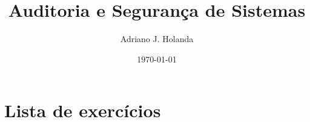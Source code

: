 \documentclass{article}
\title{Auditoria e Segurança de Sistemas}
\author{Adriano J. Holanda}
\date{\today}
\newcounter{exno}
\let\IN
\renewcommand\setcounter{exno}{0}}
\begin{document}
\maketitle

\section*{Lista de exercícios}






\end{document}
